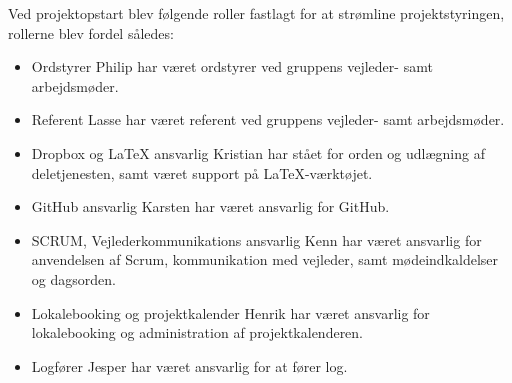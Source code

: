 Ved projektopstart blev følgende roller fastlagt for at strømline projektstyringen, rollerne blev fordel således: 

\begin{itemize}
	\item Ordstyrer \newline
		Philip har været ordstyrer ved gruppens vejleder- samt arbejdsmøder.
	\item Referent \newline
		Lasse har været referent ved gruppens vejleder- samt arbejdsmøder.
	\item Dropbox og LaTeX ansvarlig\newline
		Kristian har stået for orden og udlægning af deletjenesten, samt været support på LaTeX-værktøjet.
	\item GitHub ansvarlig \newline
		Karsten har været ansvarlig for GitHub.
	\item SCRUM, Vejlederkommunikations ansvarlig\newline
		Kenn har været ansvarlig for anvendelsen af Scrum, kommunikation med vejleder, samt mødeindkaldelser og dagsorden.
	\item Lokalebooking og projektkalender\newline
		Henrik har været ansvarlig for lokalebooking og administration af projektkalenderen.
	\item Logfører \newline
		Jesper har været ansvarlig for at fører log.
\end{itemize}
\clearpage
